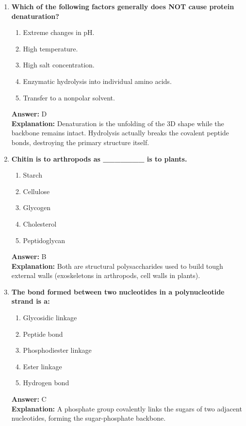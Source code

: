 \documentclass[11pt, a4paper]{article}
\begin{document}
\begin{enumerate}
\item \textbf{Which of the following factors generally does NOT cause protein denaturation?}
\begin{enumerate}[label=\Alph*.]
    \item Extreme changes in pH.
    \item High temperature.
    \item High salt concentration.
    \item Enzymatic hydrolysis into individual amino acids.
    \item Transfer to a nonpolar solvent.
\end{enumerate}
\textbf{Answer:} D \\
\textbf{Explanation:} Denaturation is the unfolding of the 3D shape while the backbone remains intact. Hydrolysis actually breaks the covalent peptide bonds, destroying the primary structure itself.

\item \textbf{Chitin is to arthropods as \_\_\_\_\_\_\_ is to plants.}
\begin{enumerate}[label=\Alph*.]
    \item Starch
    \item Cellulose
    \item Glycogen
    \item Cholesterol
    \item Peptidoglycan
\end{enumerate}
\textbf{Answer:} B \\
\textbf{Explanation:} Both are structural polysaccharides used to build tough external walls (exoskeletons in arthropods, cell walls in plants).

\item \textbf{The bond formed between two nucleotides in a polynucleotide strand is a:}
\begin{enumerate}[label=\Alph*.]
    \item Glycosidic linkage
    \item Peptide bond
    \item Phosphodiester linkage
    \item Ester linkage
    \item Hydrogen bond
\end{enumerate}
\textbf{Answer:} C \\
\textbf{Explanation:} A phosphate group covalently links the sugars of two adjacent nucleotides, forming the sugar-phosphate backbone.


\end{enumerate}
\end{document}
